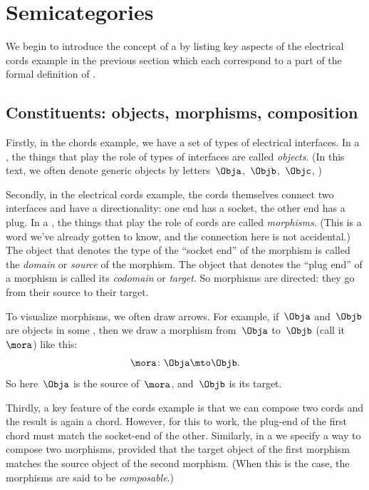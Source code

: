 
\section[Semicategories]{Semicategories}
\label{sec:formal-def-semicat}


We begin to introduce the concept of a  by listing key aspects of the electrical cords example in the previous section which each correspond to a part of the formal definition of .

\subsection{Constituents: objects, morphisms, composition}

Firstly, in the chords example, we have a set of types of electrical interfaces.
In a , the things that play the role of types of interfaces are called \emph{objects}.
(In this text, we often denote generic objects by letters~$\Obja$,~$\Objb$,~$\Objc$, \etc)

Secondly, in the electrical cords example, the cords themselves connect two interfaces and have a directionality: one end has a socket, the other end has a plug.
In a , the things that play the role of cords are called \emph{morphisms}.
(This is a word we've already gotten to know, and the connection here is not accidental.) The object that denotes the type of the ``socket end'' of the morphism is called the \emph{domain} or \emph{source} of the morphism.
The object that denotes the ``plug end'' of a morphism is called its \emph{codomain} or \emph{target}.
So morphisms are directed: they go from their source to their target.

To visualize morphisms, we often draw arrows.
For example, if~$\Obja$ and~$\Objb$ are objects in some , then we draw a morphism from~$\Obja$ to~$\Objb$ (call it~$\mora$) like this:
\begin{equation}
    \mora\colon \Obja \mto \Objb.
\end{equation}
So here~$\Obja$ is the source of~$\mora$, and~$\Objb$ is its target.

Thirdly, a key feature of the cords example is that we can compose two cords and the result is again a chord.
However, for this to work, the plug-end of the first chord must match the socket-end of the other.
Similarly, in a  we specify a way to compose two morphisms, provided that the target object of the first morphism matches the source object of the second morphism.
(When this is the case, the morphisms are said to be \emph{composable}.)

